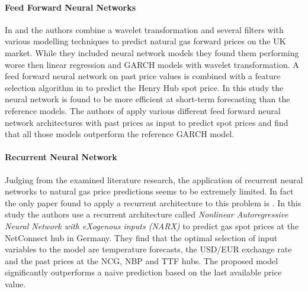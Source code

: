 \paragraph{Feed Forward Neural Networks}
In \cite{nguyen_combining_2008} and \cite{nguyen_short-term_2010} the authors combine a wavelet transformation and several filters with various modelling techniques to predict natural gas forward prices on the UK market. While they included neural network models they found them performing worse then linear regression and GARCH models with wavelet transformation. A feed forward neural network on past price values is combined with a feature selection algorithm in  \cite{salehnia_forecasting_2013} to predict the Henry Hub spot price. In this study the neural network is found to be more efficient at short-term forecasting than the reference models. The authors of \cite{panella_forecasting_2012} apply various different feed forward neural network architectures with past prices as input to predict spot prices and find that all those models outperform the reference GARCH model.   

\paragraph{Recurrent Neural Network}
Judging from the examined literature research, the application of recurrent neural networks to natural gas price predictions seems to be extremely limited.
In fact the only paper found to apply a recurrent architecture to this problem is \cite{busse_forecasting_2012}. In this study the authors use a recurrent architecture called \textit{Nonlinear Autoregressive Neural Network with eXogenous inputs (NARX)} to predict gas spot prices at the NetConnect hub in Germany. They find that the optimal selection of input variables to the model are temperature forecasts, the USD/EUR exchange rate and the past prices at the NCG, NBP and TTF hubs. The proposed model significantly outperforms a naive prediction based on the last available price value. 

